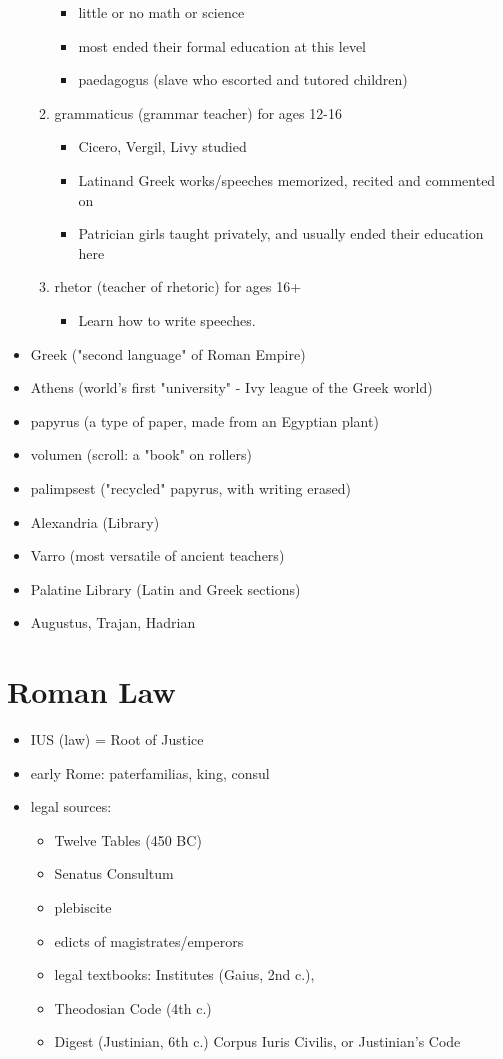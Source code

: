 \documentclass[12pt, twoside]{article}
\begin{document}
\begin{itemize}
\begin{enumerate}
\begin{itemize}
		\item little or no math or science
		\item most ended their formal education at this level
		\item paedagogus (slave who escorted and tutored children)
		\end{itemize}
	\item grammaticus (grammar teacher) for ages 12-16
		\begin{itemize}
		\item Cicero, Vergil, Livy studied
		\item Latinand Greek works/speeches memorized, recited and commented on 
		\item Patrician girls taught privately, and usually ended their education here
		\end{itemize}
	\item rhetor (teacher of rhetoric) for ages 16+
		\begin{itemize}
		\item Learn how to write speeches.
		\end{itemize}
	\end{enumerate}
\item Greek ("second language" of Roman Empire)
\item Athens (world's first "university" - Ivy league of the Greek world)
\item papyrus (a type of paper, made from an Egyptian plant)
\item volumen (scroll: a "book" on rollers)
\item palimpsest ("recycled" papyrus, with writing erased)
\item Alexandria (Library)
\item Varro (most versatile of ancient teachers)
\item Palatine Library (Latin and Greek sections)
\item Augustus, Trajan, Hadrian
\end{itemize}

\section{Roman Law}
\begin{itemize}
\item IUS (law) = Root of Justice
\item early Rome: paterfamilias, king, consul
\item legal sources:
	\begin{itemize}
	\item Twelve Tables (450 BC)
	\item Senatus Consultum
	\item plebiscite
	\item edicts of magistrates/emperors
	\item legal textbooks: Institutes (Gaius, 2nd c.),
	\item Theodosian Code (4th c.)
	\item Digest (Justinian, 6th c.) Corpus Iuris Civilis, or Justinian’s Code 
	\end{itemize}
\end{itemize}
\end{document}
